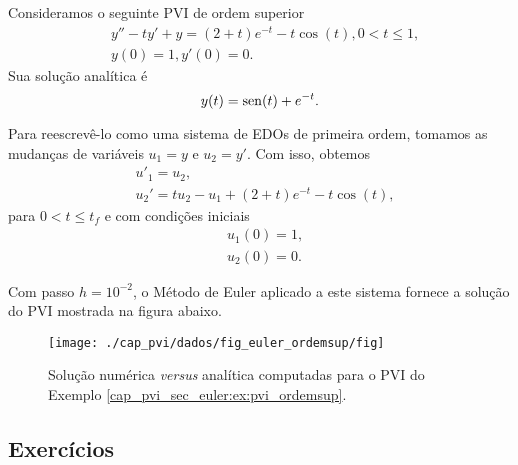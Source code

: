 \begin{ex}\label{cap_pvi_sec_euler:ex:pvi_ordemsup}
  Consideramos o seguinte PVI de ordem superior
  \begin{subequations}
    \begin{align}
      &y'' - ty' + y = (2 + t)e^{-t} - t\cos(t), 0 < t \leq 1,\\
      &y(0) = 1, y'(0) = 0.
    \end{align}
  \end{subequations}
  Sua solução analítica é
  \begin{equation}
    y(t) = \operatorname{sen}(t) + e^{-t}.
  \end{equation}

  Para reescrevê-lo como uma sistema de EDOs de primeira ordem, tomamos as mudanças de variáveis $u_1 = y$ e $u_2 = y'$. Com isso, obtemos
  \begin{subequations}
    \begin{align}
      &u'_1 = u_2,\\
      &u_2' = tu_2 - u_1 + (2+t)e^{-t} - t\cos(t),
    \end{align}
  \end{subequations}
  para $0 < t \leq t_f$ e com condições iniciais
  \begin{subequations}
    \begin{align}
      &u_1(0) = 1,\\
      &u_2(0) = 0.
    \end{align}
  \end{subequations}

  Com passo $h=10^{-2}$, o Método de Euler aplicado a este sistema fornece a solução do PVI mostrada na figura abaixo.

  \begin{figure}[H]
    \centering
    \texttt{[image: ./cap\_pvi/dados/fig\_euler\_ordemsup/fig]}
    \caption{Solução numérica \textit{versus} analítica computadas para o PVI do Exemplo \ref{cap_pvi_sec_euler:ex:pvi_ordemsup}.}
    \label{cap_pvi_sec_euler:fig:pvi_ordemsup}
  \end{figure}
\end{ex}

\subsection{Exercícios}

